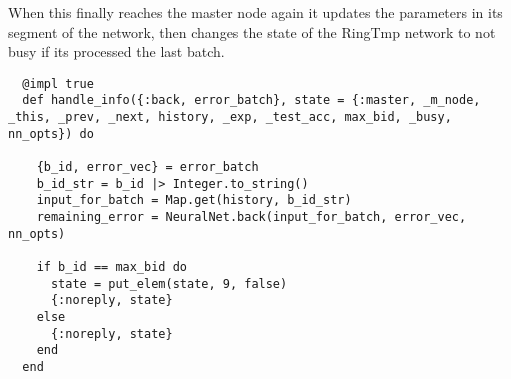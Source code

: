 When this finally reaches the master node again it updates the parameters in its
segment of the network, then changes the state of the RingTmp network to not busy
if its processed the last batch.
\begin{lstlisting}
  @impl true
  def handle_info({:back, error_batch}, state = {:master, _m_node, _this, _prev, _next, history, _exp, _test_acc, max_bid, _busy, nn_opts}) do

    {b_id, error_vec} = error_batch
    b_id_str = b_id |> Integer.to_string()
    input_for_batch = Map.get(history, b_id_str)
    remaining_error = NeuralNet.back(input_for_batch, error_vec, nn_opts)

    if b_id == max_bid do
      state = put_elem(state, 9, false)
      {:noreply, state}
    else
      {:noreply, state}
    end
  end
\end{lstlisting}









